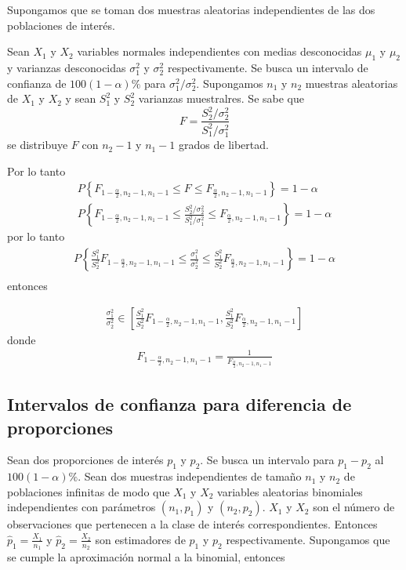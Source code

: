 \begin{itemize}
\begin{enumerate}
Supongamos que se toman dos muestras aleatorias independientes de las dos poblaciones de inter\'es.

Sean $X_{1}$ y $X_{2}$ variables normales independientes con medias desconocidas $\mu_{1}$ y $\mu_{2}$ y varianzas desconocidas $\sigma_{1}^{2}$ y $\sigma_{2}^{2}$ respectivamente. Se busca un intervalo de confianza de $100\left(1-\alpha\right)\%$ para $\sigma_{1}^{2}/\sigma_{2}^{2}$.\medskip
Supongamos $n_{1}$ y $n_{2}$ muestras aleatorias de $X_{1}$ y $X_{2}$ y sean $S_{1}^{2}$ y $S_{2}^{2}$ varianzas muestralres. Se sabe que 
$$F=\frac{S_{2}^{2}/\sigma_{2}^{2}}{S_{1}^{2}/\sigma_{1}^{2}}$$
se distribuye $F$ con $n_{2}-1$ y $n_{1}-1$ grados de libertad.

Por lo tanto
\begin{eqnarray*}
P\left\{F_{1-\frac{\alpha}{2},n_{2}-1,n_{1}-1}\leq F\leq F_{\frac{\alpha}{2},n_{2}-1,n_{1}-1}\right\}=1-\alpha\\
P\left\{F_{1-\frac{\alpha}{2},n_{2}-1,n_{1}-1}\leq \frac{S_{2}^{2}/\sigma_{2}^{2}}{S_{1}^{2}/\sigma_{1}^{2}}\leq F_{\frac{\alpha}{2},n_{2}-1,n_{1}-1}\right\}=1-\alpha
\end{eqnarray*}
por lo tanto
\begin{eqnarray*}
P\left\{\frac{S_{1}^{2}}{S_{2}^{2}}F_{1-\frac{\alpha}{2},n_{2}-1,n_{1}-1}\leq \frac{\sigma_{1}^{2}}{\sigma_{2}^{2}}\leq \frac{S_{1}^{2}}{S_{2}^{2}}F_{\frac{\alpha}{2},n_{2}-1,n_{1}-1}\right\}=1-\alpha\\
\end{eqnarray*}
entonces


\begin{eqnarray*}
\frac{\sigma_{1}^{2}}{\sigma_{2}^{2}}\in \left[\frac{S_{1}^{2}}{S_{2}^{2}}F_{1-\frac{\alpha}{2},n_{2}-1,n_{1}-1}, \frac{S_{1}^{2}}{S_{2}^{2}}F_{\frac{\alpha}{2},n_{2}-1,n_{1}-1}\right]
\end{eqnarray*}
donde
\begin{eqnarray*}
F_{1-\frac{\alpha}{2},n_{2}-1,n_{1}-1}=\frac{1}{F_{\frac{\alpha}{2},n_{2}-1,n_{1}-1}}
\end{eqnarray*}
\subsection*{Intervalos de confianza para diferencia de proporciones}
Sean dos proporciones de inter\'es $p_{1}$ y $p_{2}$. Se busca un intervalo para $p_{1}-p_{2}$ al $100\left(1-\alpha\right)\%$. Sean dos muestras independientes de tama\~no $n_{1}$ y $n_{2}$ de poblaciones infinitas de modo que $X_{1}$ y $X_{2}$ variables aleatorias binomiales independientes con par\'ametros $\left(n_{1},p_{1}\right)$ y $\left(n_{2},p_{2}\right)$.  $X_{1}$ y $X_{2}$ son  el n\'umero de observaciones que pertenecen a la clase de inter\'es correspondientes. Entonces $\hat{p}_{1}=\frac{X_{1}}{n_{1}}$ y $\hat{p}_{2}=\frac{X_{2}}{n_{2}}$ son estimadores de $p_{1}$ y $p_{2}$ respectivamente. Supongamos que se cumple la aproximaci\'on  normal a la binomial, entonces


\end{enumerate}
\end{itemize}
